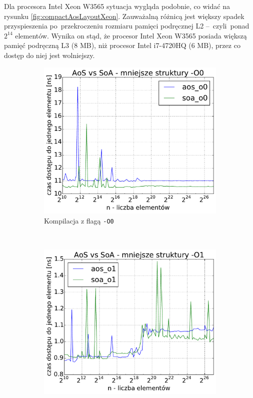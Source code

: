 Dla procesora Intel Xeon W3565 sytuacja wygląda podobnie, co widać na rysunku \ref{fig:compactAosLayoutXeon}. Zauważalną różnicą jest większy spadek przyspieszenia po~przekroczeniu rozmiaru pamięci podręcznej L2 --~czyli~ponad $2^{14}$ elementów. Wynika on stąd, że procesor Intel Xeon W3565 posiada większą pamięć podręczną L3 (8 MB), niż procesor Intel i7-4720HQ (6 MB), przez co dostęp do niej jest wolniejszy.

\begin{figure}
    \centering
    \begin{subfigure}[c]{0.45\textwidth}
        \centering
        \includegraphics[width=\textwidth]{images/benchs/compact_aos_vs_soa_O0}
        \caption{Kompilacja z flagą \texttt{-O0}}
    \end{subfigure}
    ~
    \begin{subfigure}[c]{0.45\textwidth}
        \centering
        \includegraphics[width=\textwidth]{images/benchs/compact_aos_vs_soa_O1}

\end{subfigure}
\end{figure}
